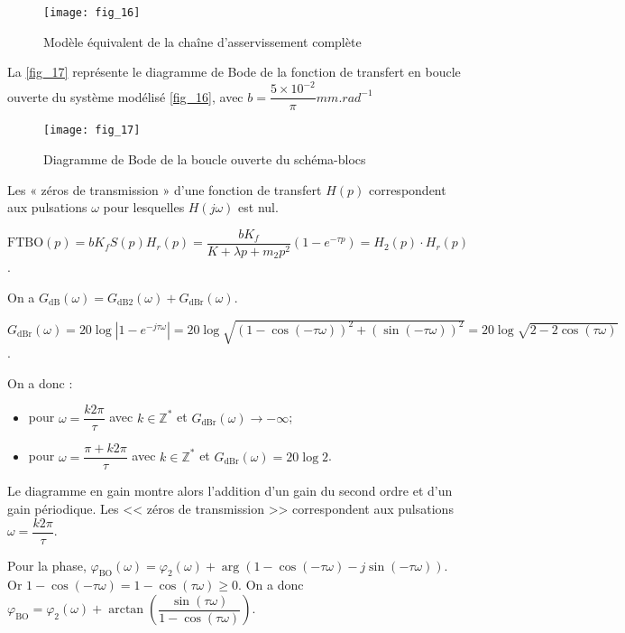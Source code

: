 \begin{multicols}{2}
\begin{figure}[H]
\centering
\texttt{[image: fig\_16]}
\caption{Modèle équivalent de la chaîne d'asservissement complète\label{fig_16}}
\end{figure}


La \autoref{fig_17} représente le diagramme de Bode de la fonction de transfert en boucle ouverte du système modélisé
\autoref{fig_16}, avec $b=\dfrac{5\times 10^{-2}}{\pi} \si{mm.rad^{-1}}$

\begin{figure}[H]
\centering
\texttt{[image: fig\_17]}
\caption{Diagramme de Bode de la boucle ouverte du schéma-blocs\label{fig_17}}
\end{figure}


Les « zéros de transmission » d’une fonction de transfert $H(p)$ correspondent aux pulsations $\omega$ pour lesquelles
$H\left(j \omega\right)$ est nul.

\ifprof
\begin{corrige}
$\text{FTBO}(p)=bK_f S(p)H_r(p)= \dfrac{bK_f}{K+\lambda p +m_2 p^2}\left(1-e^{-\tau p}\right) = H_2(p)\cdot H_r(p)$.

On a $G_{\text{dB}}(\omega)=G_{\text{dB2}}(\omega) + G_{\text{dBr}}(\omega)$.

$G_{\text{dBr}}(\omega) = 20\log \left|1-e^{-j\tau \omega} \right|=20\log 
\sqrt{\left( 1-\cos \left(-\tau \omega \right)\right)^2 + \left( \sin \left(-\tau \omega \right)\right)^2 } = 20\log \sqrt{2-2\cos \left( \tau \omega \right)}$.

On a donc :
\begin{itemize}
\item pour $\omega=\dfrac{k2\pi }{\tau}$ avec $k\in \mathbb{Z}^*$ et $G_{\text{dBr}}(\omega) \to -\infty $;
\item pour $\omega=\dfrac{\pi + k2\pi }{\tau}$ avec $k\in \mathbb{Z}^*$ et $G_{\text{dBr}}(\omega) = 20 \log 2$.
\end{itemize}

Le diagramme en gain montre alors l'addition d'un gain du second ordre et d'un gain périodique. Les << zéros de transmission >> correspondent aux pulsations $\omega=\dfrac{k2\pi }{\tau}$.

Pour la phase, $\varphi_{\text{BO}}\left( \omega\right)=\varphi_2\left( \omega\right)+\arg\left( 1-\cos\left( -\tau\omega\right) - j\sin\left(-\tau\omega\right)\right)$. Or $1-\cos\left( -\tau\omega\right) = 1-\cos\left( \tau \omega \right) \geq 0$. On a donc 
 $\varphi_{\text{BO}}=\varphi_2\left( \omega\right)+\arctan \left(\dfrac{\sin\left( \tau\omega\right)}{1-\cos\left( \tau\omega\right)} \right)$.


\end{corrige}
\end{multicols}
